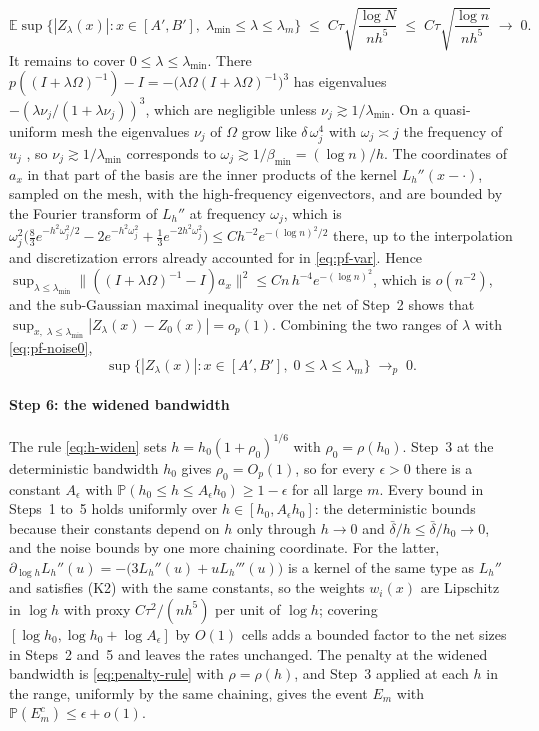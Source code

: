 \documentclass[preprint,12pt,authoryear,times]{elsarticle}
\newcommand{\E}{\mathbb{E}}
\newcommand{\Prob}{\mathbb{P}}
\begin{document}
\[
\E\sup\bigl\{|Z_\lambda(x)|:x\in[A',B'],\;\lambda_{\min}\le\lambda\le\lambda_m\bigr\}\;\le\;C\tau\sqrt{\frac{\log N}{nh^5}}\;\le\;C\tau\sqrt{\frac{\log n}{nh^5}}\;\to\;0 .
\]
It remains to cover \(0\le\lambda\le\lambda_{\min}\). There \(p((I+\lambda\Omega)^{-1})-I=-\bigl(\lambda\Omega(I+\lambda\Omega)^{-1}\bigr)^3\) has eigenvalues \(-(\lambda\nu_j/(1+\lambda\nu_j))^3\), which are negligible unless \(\nu_j\gtrsim 1/\lambda_{\min}\). On a quasi-uniform mesh the eigenvalues \(\nu_j\) of \(\Omega\) grow like \(\delta\,\omega_j^4\) with \(\omega_j\asymp j\) the frequency of \(u_j\) \citep{green1994}, so \(\nu_j\gtrsim 1/\lambda_{\min}\) corresponds to \(\omega_j\gtrsim 1/\beta_{\min}=(\log n)/h\). The coordinates of \(a_x\) in that part of the basis are the inner products of the kernel \(L_h''(x-\cdot)\), sampled on the mesh, with the high-frequency eigenvectors, and are bounded by the Fourier transform of \(L_h''\) at frequency \(\omega_j\), which is \(\omega_j^2\bigl(\tfrac83e^{-h^2\omega_j^2/2}-2e^{-h^2\omega_j^2}+\tfrac13e^{-2h^2\omega_j^2}\bigr)\le Ch^{-2}e^{-(\log n)^2/2}\) there, up to the interpolation and discretization errors already accounted for in \eqref{eq:pf-var}. Hence \(\sup_{\lambda\le\lambda_{\min}}\|((I+\lambda\Omega)^{-1}-I)a_x\|^2\le Cn\,h^{-4}e^{-(\log n)^2}\), which is \(o(n^{-2})\), and the sub-Gaussian maximal inequality over the net of Step~2 shows that \(\sup_{x,\;\lambda\le\lambda_{\min}}|Z_\lambda(x)-Z_0(x)|=o_p(1)\). Combining the two ranges of \(\lambda\) with \eqref{eq:pf-noise0},
\[
\sup\bigl\{|Z_\lambda(x)|:x\in[A',B'],\;0\le\lambda\le\lambda_m\bigr\}\;\to_p\;0 .
\]

\paragraph{Step 6: the widened bandwidth}
The rule \eqref{eq:h-widen} sets \(h=h_0(1+\rho_0)^{1/6}\) with \(\rho_0=\rho(h_0)\). Step~3 at the deterministic bandwidth \(h_0\) gives \(\rho_0=O_p(1)\), so for every \(\epsilon>0\) there is a constant \(A_\epsilon\) with \(\Prob(h_0\le h\le A_\epsilon h_0)\ge 1-\epsilon\) for all large \(m\). Every bound in Steps~1 to~5 holds uniformly over \(h\in[h_0,A_\epsilon h_0]\): the deterministic bounds because their constants depend on \(h\) only through \(h\to 0\) and \(\bar\delta/h\le\bar\delta/h_0\to 0\), and the noise bounds by one more chaining coordinate. For the latter, \(\partial_{\log h}L_h''(u)=-\bigl(3L_h''(u)+uL_h'''(u)\bigr)\) is a kernel of the same type as \(L_h''\) and satisfies (K2) with the same constants, so the weights \(w_i(x)\) are Lipschitz in \(\log h\) with proxy \(C\tau^2/(nh^5)\) per unit of \(\log h\); covering \([\log h_0,\log h_0+\log A_\epsilon]\) by \(O(1)\) cells adds a bounded factor to the net sizes in Steps~2 and~5 and leaves the rates unchanged. The penalty at the widened bandwidth is \eqref{eq:penalty-rule} with \(\rho=\rho(h)\), and Step~3 applied at each \(h\) in the range, uniformly by the same chaining, gives the event \(E_m\) with \(\Prob(E_m^c)\le\epsilon+o(1)\).
\end{document}
